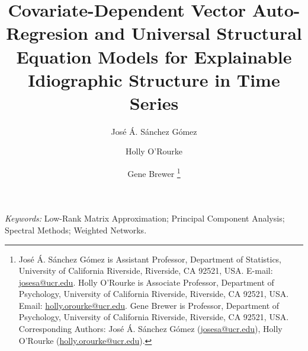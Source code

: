 \documentclass[12pt]{article}
\begin{document}
\def\spacingset#1{\renewcommand{\baselinestretch}
{#1}\small\normalsize} \spacingset{1}



{
	\title{\bf Covariate-Dependent Vector Auto-Regresion and Universal Structural Equation Models for Explainable Idiographic Structure in Time Series}
	\author{
		José Á. Sánchez Gómez \and  Holly O'Rourke \and  Gene Brewer \thanks{ José Á. Sánchez Gómez is Assistant Professor, Department of Statistics, University of California Riverside, Riverside, CA 92521, USA. E-mail: \href{mailto:josesa@ucr.edu}{josesa@ucr.edu}. Holly O'Rourke is Associate Professor, Department of Psychology, University of California Riverside, Riverside, CA 92521, USA. Email: \href{mailto:holly.orourke@ucr.edu}{holly.orourke@ucr.edu}. Gene Brewer is Professor, Department of Psychology, University of California Riverside, Riverside, CA 92521, USA.\\
		Corresponding Authors: José Á. Sánchez Gómez (\href{mailto:josesa@ucr.edu}{josesa@ucr.edu}), Holly O'Rourke (\href{mailto:holly.orourke@ucr.edu}{holly.orourke@ucr.edu}).}
	}
	\date{}
	\maketitle
}


\bigskip
\begin{abstract}
	
\end{abstract}

\noindent
{\it Keywords:}  Low-Rank Matrix Approximation; Principal Component Analysis; Spectral Methods;  Weighted Networks.
\vfill


\newpage
\spacingset{1.5}
\setlength{\abovedisplayskip}{2pt}
\setlength{\belowdisplayskip}{2pt}












\end{document}
